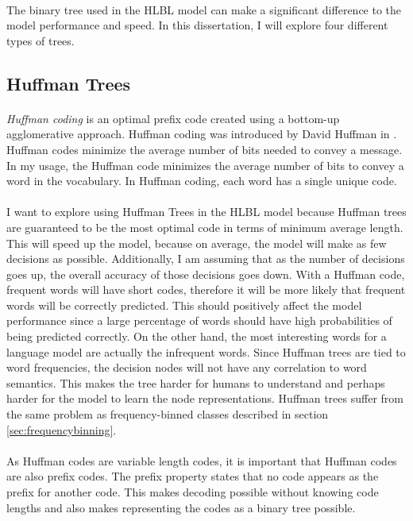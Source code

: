 \documentclass[12pt]{ociamthesis}  %
\begin{document}
\paragraph{}
The binary tree used in the HLBL model can make a significant difference to the model performance and speed. In this dissertation, I will explore four different types of trees.
\subsection{Huffman Trees}
\paragraph{}
\emph{Huffman coding} is an optimal prefix code created using a bottom-up agglomerative approach. Huffman coding was introduced by David Huffman in \cite{Huffman1952}. Huffman codes minimize the average number of bits needed to convey a message. In my usage, the Huffman code minimizes the average number of bits to convey a word in the vocabulary. In Huffman coding, each word has a single unique code.
\paragraph{}
I want to explore using Huffman Trees in the HLBL model because Huffman trees are guaranteed to be the most optimal code in terms of minimum average length. This will speed up the model, because on average, the model will make as few decisions as possible. Additionally, I am assuming that as the number of decisions goes up, the overall accuracy of those decisions goes down. With a Huffman code, frequent words will have short codes, therefore it will be more likely that frequent words will be correctly predicted. This should positively affect the model performance since a large percentage of words should have high probabilities of being predicted correctly. On the other hand, the most interesting words for a language model are actually the infrequent words.  Since Huffman trees are tied to word frequencies, the decision nodes will not have any correlation to word semantics. This makes the tree harder for humans to understand and perhaps harder for the model to learn the node representations.  Huffman trees suffer from the same problem as frequency-binned classes described in section \ref{sec:frequencybinning}.
\paragraph{}
As Huffman codes are variable length codes, it is important that Huffman codes are also prefix codes. The prefix property states that no code appears as the prefix for another code. This makes decoding possible without knowing code lengths and also makes representing the codes as a binary tree possible. 
\end{document}
